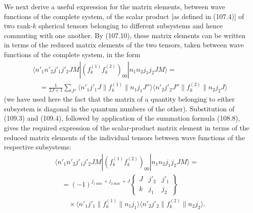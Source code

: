 

We next derive a useful expression for the matrix elements, between wave functions of the complete system, of the scalar product [as defined in (107.4)] of two rank-$k$ spherical tensors belonging to different subsystems and hence commuting with one another. By (107.10), these matrix elements can be written in terms of the reduced matrix elements of the two tensors, taken between wave functions of the complete system, in the form
\[
 \begin{aligned}
 &\langle n'_1n'_2j'_1j'_2JM|(f_k^{(1)}f_k^{(2)})_{00}|n_1n_2j_1j_2JM\rangle={}\\
 &\quad=\frac1{2J+1}\sum_{J''}
 \langle n'_1j'_1J\|f_k^{(1)}\|n_1j_1J''\rangle
 \langle n'_2j'_2J''\|f_k^{(2)}\|n_2j_2J\rangle
 \end{aligned}
\]
(we have used here the fact that the matrix of a quantity belonging to either subsystem is diagonal in the quantum numbers of the other). Substitution of (109.3) and (109.4), followed by application of the summation formula (108.8), gives the required expression of the scalar-product matrix element in terms of the reduced matrix elements of the individual tensors between wave functions of the respective subsystems:
\begin{equation}
 \begin{aligned}
 &\langle n'_1n'_2j'_1j'_2JM|(f_k^{(1)}f_k^{(2)})_{00}|n_1n_2j_1j_2JM\rangle={}\\
 &\quad=(-1)^{j_{1\min}+j_{2\max}+J}
 \begin{Bmatrix}J&j'_2&j'_1\\k&j_1&j_2\end{Bmatrix}\\
 &\qquad\times
 \langle n'_1j'_1\|f_k^{(1)}\|n_1j_1\rangle
 \langle n'_2j'_2\|f_k^{(2)}\|n_2j_2\rangle.
 \end{aligned}
 \tag{109.5}
\end{equation}

